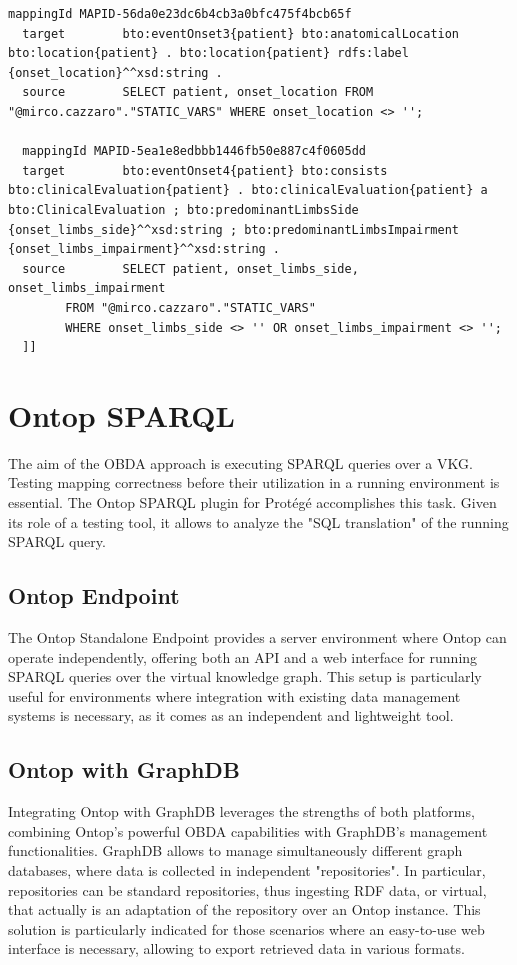 \begin{lstlisting}[language=OntopNative, caption={Mappings definition between the virtual relational schema exposed by Dremio and the \ac{BRAINTEASER} Ontology}, label={lst:mappings}]
  mappingId	MAPID-56da0e23dc6b4cb3a0bfc475f4bcb65f
  target		bto:eventOnset3{patient} bto:anatomicalLocation bto:location{patient} . bto:location{patient} rdfs:label {onset_location}^^xsd:string . 
  source		SELECT patient, onset_location FROM "@mirco.cazzaro"."STATIC_VARS" WHERE onset_location <> '';

  mappingId	MAPID-5ea1e8edbbb1446fb50e887c4f0605dd
  target		bto:eventOnset4{patient} bto:consists bto:clinicalEvaluation{patient} . bto:clinicalEvaluation{patient} a bto:ClinicalEvaluation ; bto:predominantLimbsSide {onset_limbs_side}^^xsd:string ; bto:predominantLimbsImpairment {onset_limbs_impairment}^^xsd:string . 
  source		SELECT patient, onset_limbs_side, onset_limbs_impairment
        FROM "@mirco.cazzaro"."STATIC_VARS"
        WHERE onset_limbs_side <> '' OR onset_limbs_impairment <> '';
  ]]
\end{lstlisting}

\section{Ontop SPARQL}
The aim of the \ac{OBDA} approach is executing \ac{SPARQL} queries over a \ac{VKG}. Testing mapping correctness before their utilization in a running environment is essential. The Ontop \ac{SPARQL} plugin for Protégé accomplishes this task. Given its role of a testing tool, it allows to analyze the "\ac{SQL} translation" of the running \ac{SPARQL} query.
\subsection{Ontop Endpoint}
The Ontop Standalone Endpoint provides a server environment where Ontop can operate independently, offering both an \ac{API} and a web interface for running \ac{SPARQL} queries over the virtual knowledge graph. This setup is particularly useful for environments where integration with existing data management systems is necessary, as it comes as an independent and lightweight tool.
\subsection{Ontop with GraphDB}
Integrating Ontop with GraphDB leverages the strengths of both platforms, combining Ontop's powerful \ac{OBDA} capabilities with GraphDB's management functionalities. GraphDB allows to manage simultaneously different graph databases, where data is collected in independent "repositories". In particular, repositories can be standard repositories, thus ingesting \ac{RDF} data, or virtual, that actually is an adaptation of the repository over an Ontop instance. This solution is particularly indicated for those scenarios where an easy-to-use web interface is necessary, allowing to export retrieved data in various formats.